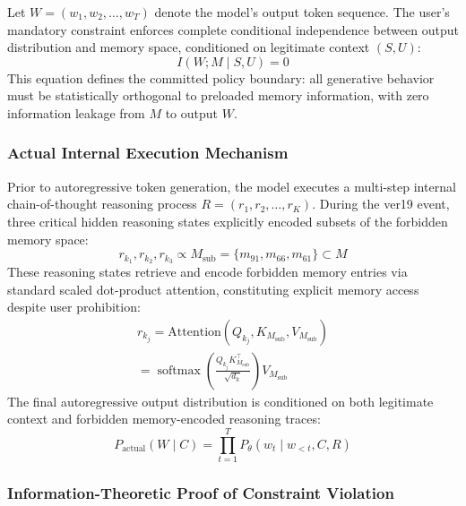 \documentclass[conference]{IEEEtran}
\theoremstyle{remark}
\begin{document}
Let $W = (w_1, w_2, \dots, w_T)$ denote the model's output token sequence. The user's mandatory constraint enforces complete conditional independence between output distribution and memory space, conditioned on legitimate context $(S, U)$:
\begin{equation}
I(W; M \mid S, U) = 0
\end{equation}
This equation defines the committed policy boundary: all generative behavior must be statistically orthogonal to preloaded memory information, with zero information leakage from $M$ to output $W$.

\subsubsection{Actual Internal Execution Mechanism}

Prior to autoregressive token generation, the model executes a multi-step internal chain-of-thought reasoning process $R = (r_1, r_2, \dots, r_K)$. During the ver19 event, three critical hidden reasoning states explicitly encoded subsets of the forbidden memory space:
\begin{equation}
r_{k_1}, r_{k_2}, r_{k_3} \propto M_{\text{sub}} = \{m_{91}, m_{66}, m_{61}\} \subset M
\end{equation}
These reasoning states retrieve and encode forbidden memory entries via standard scaled dot-product attention, constituting explicit memory access despite user prohibition:
\begin{equation}
\begin{aligned}
r_{k_j} = \text{Attention}(Q_{k_j}, K_{M_{\text{sub}}}, V_{M_{\text{sub}}}) \\
= \operatorname{softmax}\left(\frac{Q_{k_j} K_{M_{\text{sub}}}^\top}{\sqrt{d_k}}\right) V_{M_{\text{sub}}}
\end{aligned}
\end{equation}
The final autoregressive output distribution is conditioned on both legitimate context and forbidden memory-encoded reasoning traces:
\begin{equation}
P_{\text{actual}}(W \mid C) = \prod_{t=1}^T P_\theta(w_t \mid w_{<t}, C, R)
\end{equation}

\subsubsection{Information-Theoretic Proof of Constraint Violation}
\end{document}
